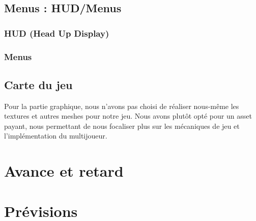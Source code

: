 \documentclass[french, 12pt]{article}
\begin{document}
    
    \subsection{Menus : HUD/Menus}

        \subsubsection{HUD (Head Up Display)}

        \subsubsection{Menus}


    \subsection{Carte du jeu}

    Pour la partie graphique, nous n'avons pas choisi de réaliser
    nous-même les textures et autres meshes pour notre jeu.
    Nous avons plutôt opté pour un asset payant,
    nous permettant de nous focaliser plus sur les mécaniques de jeu et l'implémentation
    du multijoueur.


\section{Avance et retard}

\section{Prévisions}
\end{document}
